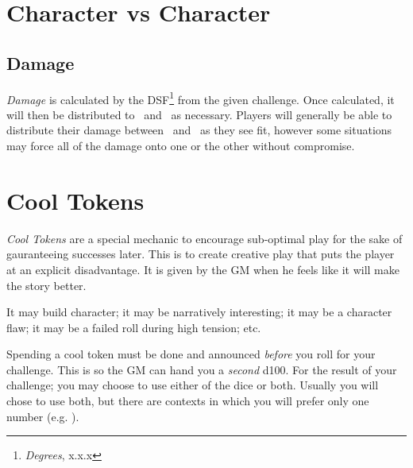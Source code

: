 
\section{Character vs Character}
\subsection{Damage}

\emph{Damage} is calculated by the DSF\footnote{\emph{Degrees}, x.x.x} from
the given challenge. Once calculated, it will then be distributed
to \HPful\ and \ENful\ as necessary. Players will generally be able
to distribute their damage between \HPful\ and \ENful\ as they see
fit, however some situations may force all of the damage onto one
or the other without compromise.

\section{Cool Tokens}

\emph{Cool Tokens} are a special mechanic to encourage sub-optimal play for
the sake of gauranteeing successes later. This is to create creative
play that puts the player at an explicit disadvantage. It is given
by the GM when he feels like it will make the story better.

It may build character; it may be narratively interesting; it may
be a character flaw; it may be a failed roll during high tension;
etc.

Spending a cool token must be done and announced \emph{before} you
roll for your challenge. This is so the GM can hand you a \emph{second}
d100. For the result of your challenge; you may choose to use either
of the dice or both. Usually you will chose to use both, but there are contexts in which you will prefer only one number (e.g. \FORE ).



